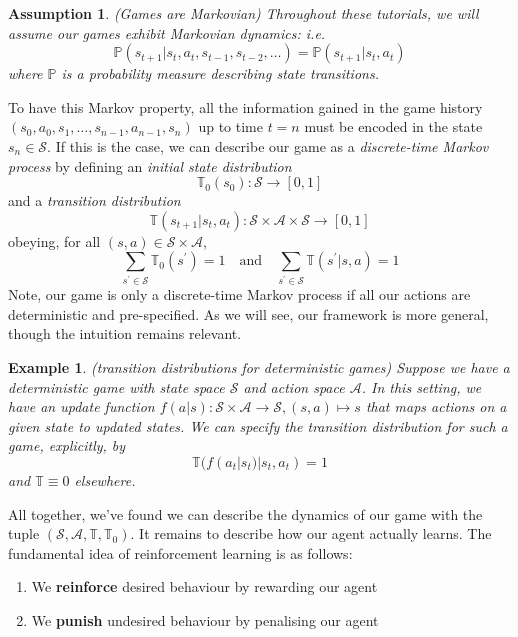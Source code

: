 \documentclass[12pt]{article}
\newtheorem{example}{Example}
\newtheorem{assumption}{Assumption}
\begin{document}
\begin{assumption}(Games are Markovian)
    Throughout these tutorials, we will assume our games exhibit Markovian dynamics: i.e. 
    $$\mathbb{P}(s_{t+1} | s_t, a_t, s_{t-1}, s_{t-2}, \dots) = \mathbb{P}(s_{t+1} | s_t, a_t)$$
    where $\mathbb{P}$ is a probability measure describing state transitions. 
\end{assumption}

To have this Markov property, all the information gained in the game history $(s_0, a_0, s_1, \dots, s_{n-1}, a_{n-1}, s_n)$ up 
to time $t=n$ must be encoded in the state $s_n \in \mathcal{S}$. If this is the case, we can describe our game as a 
\textit{discrete-time Markov process} by defining an \textit{initial state distribution}
$$
\mathbb{T}_0(s_0): \mathcal{S} \to [0, 1]
$$
and a \textit{transition distribution}
$$
\mathbb{T}(s_{t+1} | s_t, a_t): \mathcal{S} \times \mathcal{A} \times \mathcal{S} \to [0,1]
$$
obeying, for all $(s, a) \in \mathcal{S} \times \mathcal{A}$,
$$
\sum_{s^\prime \in \mathcal{S}} \mathbb{T}_0(s^\prime) = 1 \quad \text{and} \quad 
\sum_{s^\prime \in \mathcal{S}} \mathbb{T}(s^\prime | s, a) = 1
$$
Note, our game is only a discrete-time Markov process if all our actions are deterministic and pre-specified. As we will see, 
our framework is more general, though the intuition remains relevant.

\begin{example}{(transition distributions for deterministic games)}
    Suppose we have a deterministic game with state space $\mathcal{S}$ and action space $\mathcal{A}$. In this setting, we 
    have an update function $f(a | s): \mathcal{S} \times \mathcal{A} \to \mathcal{S}, (s, a) \mapsto s$ that maps actions on 
    a given state to updated states. We can specify the transition distribution for such a game, explicitly, by
    $$
    \mathbb{T}(f(a_t | s_t) | s_t, a_t) = 1
    $$
    and $\mathbb{T} \equiv 0$ elsewhere.
\end{example}

All together, we've found we can describe the dynamics of our game with the tuple $(\mathcal{S}, \mathcal{A}, \mathbb{T}, \mathbb{T}_0)$. 
It remains to describe how our agent actually learns. The fundamental idea of reinforcement learning is as follows: 

\begin{enumerate}
    \item We \textbf{reinforce} desired behaviour by rewarding our agent
    \item We \textbf{punish} undesired behaviour by penalising our agent
\end{enumerate}
\end{document}
